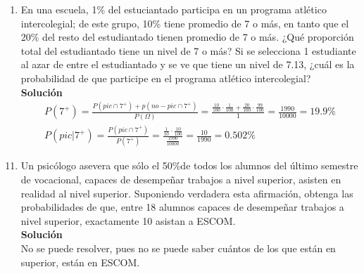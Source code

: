 \begin{enumerate}
    \item En una escuela, 1\% del estuciantado participa en un programa atlético intercolegial; de este grupo, 10\% tiene promedio de 7 o más, en tanto que el 20\% del resto del estudiantado tienen promedio de 7 o más. ¿Qué proporción total del estudiantado tiene un nivel de 7 o más? Si se selecciona 1 estudiante al azar de entre el estudiantado y se ve que tiene un nivel de 7.13, ¿cuál es la probabilidad de que participe en el programa atlético intercolegial?
	\\\textbf{Solución}
	\begin{gather*}
        P(7^+) = \frac{P(pic \cap 7^+) + p(no-pic \cap 7^+)}{P(\Omega)} = \frac{\frac{10}{100} \cdot \frac{1}{100} + \frac{20}{100} \cdot \frac{99}{100}}{1} = \frac{1990}{10000} = 19.9\% \\
        P(pic | 7^+) = \frac{P(pic \cap 7^+)}{P(7^+)} = \frac{\frac{1}{10} \cdot \frac{10}{100}}{\frac{1990}{10000}} = \frac{10}{1990} = 0.502\%
	\end{gather*}
\end{enumerate}





\begin{enumerate}
	\setcounter{enumi}{10} %
    \item Un psicólogo asevera que sólo el 50\%de todos los alumnos del último semestre de vocacional, capaces de desempeñar trabajos a nivel superior, asisten en realidad al nivel superior. Suponiendo verdadera esta afirmación, obtenga las probabilidades de que, entre 18 alumnos capaces de desempeñar trabajos a nivel superior, exactamente 10 asistan a ESCOM.
	\\\textbf{Solución}
    \\ No se puede resolver, pues no se puede saber cuántos de los que están en superior, están en ESCOM.
\end{enumerate}



